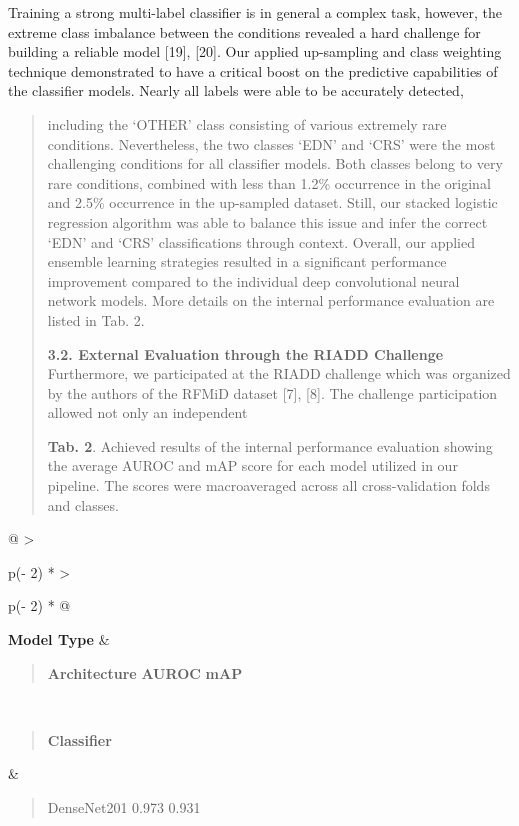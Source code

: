 \documentclass[
]{article}
\begin{document}
Training a strong multi-label classifier is in general a complex task,
however, the extreme class imbalance between the conditions revealed a
hard challenge for building a reliable model {[}19{]}, {[}20{]}. Our
applied up-sampling and class weighting technique demonstrated to have a
critical boost on the predictive capabilities of the classifier models.
Nearly all labels were able to be accurately detected,

\begin{quote}
including the `OTHER' class consisting of various extremely rare
conditions. Nevertheless, the two classes `EDN' and `CRS' were the most
challenging conditions for all classifier models. Both classes belong to
very rare conditions, combined with less than 1.2\% occurrence in the
original and 2.5\% occurrence in the up-sampled dataset. Still, our
stacked logistic regression algorithm was able to balance this issue and
infer the correct `EDN' and `CRS' classifications through context.
Overall, our applied ensemble learning strategies resulted in a
significant performance improvement compared to the individual deep
convolutional neural network models. More details on the internal
performance evaluation are listed in Tab. 2.

\textbf{3.2. External Evaluation through the RIADD Challenge}
Furthermore, we participated at the RIADD challenge which was organized
by the authors of the RFMiD dataset {[}7{]}, {[}8{]}. The challenge
participation allowed not only an independent

\textbf{Tab. 2}. Achieved results of the internal performance evaluation
showing the average AUROC and mAP score for each model utilized in our
pipeline. The scores were macroaveraged across all cross-validation
folds and classes.
\end{quote}

\begin{longtable}[]{@{}
  >{\raggedright\arraybackslash}p{(\columnwidth - 2\tabcolsep) * }
  >{\raggedright\arraybackslash}p{(\columnwidth - 2\tabcolsep) * }@{}}
\toprule
\textbf{Model Type} & \begin{minipage}[b]{\linewidth}\raggedright
\begin{quote}
\textbf{Architecture} \textbf{AUROC} \textbf{mAP}
\end{quote}
\end{minipage} \\
\midrule
\endhead
\begin{minipage}[t]{\linewidth}\raggedright
\begin{quote}
\textbf{Classifier}
\end{quote}
\end{minipage} & \begin{minipage}[t]{\linewidth}\raggedright
\begin{quote}
DenseNet201 0.973 0.931
\end{quote}
\end{minipage} \\
\bottomrule
\end{longtable}
\end{document}
